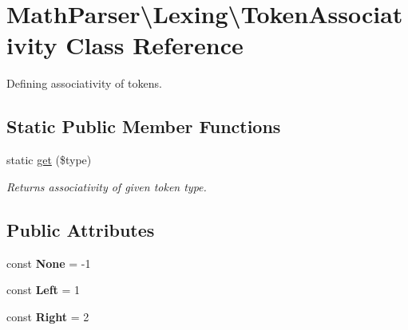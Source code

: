 \hypertarget{classMathParser_1_1Lexing_1_1TokenAssociativity}{\section{Math\-Parser\textbackslash{}Lexing\textbackslash{}Token\-Associativity Class Reference}
\label{classMathParser_1_1Lexing_1_1TokenAssociativity}
}


Defining associativity of tokens.  


\subsection*{Static Public Member Functions}
\begin{DoxyCompactItemize}
\item 
static \hyperlink{classMathParser_1_1Lexing_1_1TokenAssociativity_a9b7bd3f830a05b42f4c3dab23e460259}{get} (\$type)
\begin{DoxyCompactList}\small\item\em Returns associativity of given token type. \end{DoxyCompactList}\end{DoxyCompactItemize}
\subsection*{Public Attributes}
\begin{DoxyCompactItemize}
\item 
\hypertarget{classMathParser_1_1Lexing_1_1TokenAssociativity_adffe6855fddb6bda6d103ada98b3ce3e}{const {\bfseries None} = -\/1}\label{classMathParser_1_1Lexing_1_1TokenAssociativity_adffe6855fddb6bda6d103ada98b3ce3e}

\item 
\hypertarget{classMathParser_1_1Lexing_1_1TokenAssociativity_a6883e9d8f24bae72b130bf63bf8f9d5a}{const {\bfseries Left} = 1}\label{classMathParser_1_1Lexing_1_1TokenAssociativity_a6883e9d8f24bae72b130bf63bf8f9d5a}

\item 
\hypertarget{classMathParser_1_1Lexing_1_1TokenAssociativity_aee48fa332e48fcc040ce2383f7a0239c}{const {\bfseries Right} = 2}\label{classMathParser_1_1Lexing_1_1TokenAssociativity_aee48fa332e48fcc040ce2383f7a0239c}

\end{DoxyCompactItemize}


